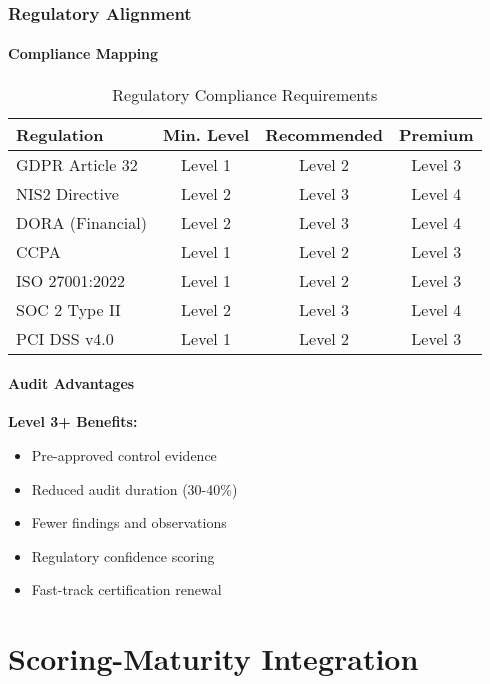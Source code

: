 \documentclass[11pt,a4paper]{article}
\begin{document}
\section{Regulatory Alignment}

\subsection{Compliance Mapping}

\begin{table}[h]
\centering
\caption{Regulatory Compliance Requirements}
\begin{tabular}{lccc}
\toprule
\textbf{Regulation} & \textbf{Min. Level} & \textbf{Recommended} & \textbf{Premium} \\
\midrule
GDPR Article 32 & Level 1 & Level 2 & Level 3 \\
NIS2 Directive & Level 2 & Level 3 & Level 4 \\
DORA (Financial) & Level 2 & Level 3 & Level 4 \\
CCPA & Level 1 & Level 2 & Level 3 \\
ISO 27001:2022 & Level 1 & Level 2 & Level 3 \\
SOC 2 Type II & Level 2 & Level 3 & Level 4 \\
PCI DSS v4.0 & Level 1 & Level 2 & Level 3 \\
\bottomrule
\end{tabular}
\end{table}

\subsection{Audit Advantages}

\textbf{Level 3+ Benefits:}
\begin{itemize}
\item Pre-approved control evidence
\item Reduced audit duration (30-40\%)
\item Fewer findings and observations
\item Regulatory confidence scoring
\item Fast-track certification renewal
\end{itemize}


\newpage
\part{Scoring-Maturity Integration}
\end{document}
